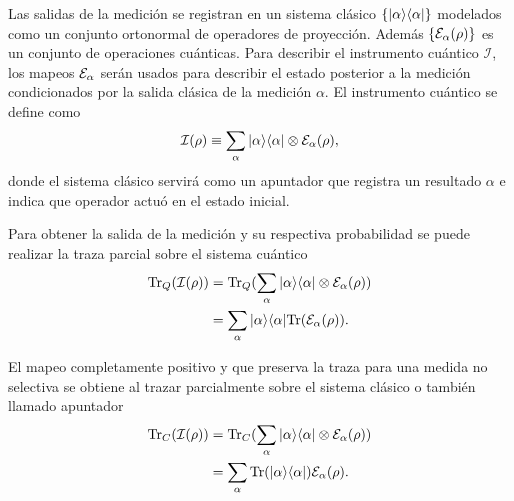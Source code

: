 Las salidas de la medición se registran en un sistema clásico $\{|\alpha\rangle \langle
\alpha |\}$ modelados como un conjunto ortonormal de operadores de proyección.
Además $\{\mathcal{E}_\alpha(\rho)\}$ es un conjunto de operaciones cuánticas. Para
describir el instrumento cuántico $\mathcal{I}$, los mapeos $\mathcal{E}_\alpha$ serán
usados para describir  el estado posterior a la medición condicionados por la
salida clásica de la medición $\alpha$. El instrumento cuántico se define
como
\begin{equation}
    \mathcal{I}(\rho)\equiv\sum_\alpha |\alpha\rangle \langle\alpha|\otimes \mathcal{E}_\alpha(\rho),
\end{equation}
donde el sistema clásico servirá como un apuntador que registra un resultado $\alpha$ e indica que operador actuó en el estado inicial.



Para obtener la salida de la medición y su respectiva probabilidad se puede
realizar la traza parcial sobre el sistema cuántico \begin{equation}
    \begin{split}
        {\rm Tr}_Q(\mathcal{I}(\rho))&={\rm Tr}_Q(\sum_\alpha |\alpha\rangle \langle\alpha|\otimes \mathcal{E}_\alpha(\rho))\\
        &=\sum_\alpha |\alpha\rangle \langle\alpha|{\rm Tr}(\mathcal{E}_\alpha(\rho)).
    \end{split}
\end{equation}

El mapeo completamente positivo y que preserva la traza para una medida no selectiva se obtiene al trazar parcialmente sobre el sistema clásico o también llamado apuntador\begin{equation}
    \begin{split}
        {\rm Tr}_C(\mathcal{I}(\rho))&={\rm Tr}_C(\sum_\alpha |\alpha\rangle \langle\alpha|\otimes \mathcal{E}_\alpha(\rho))\\
        &=\sum_\alpha {\rm Tr}(|\alpha\rangle \langle\alpha|)\mathcal{E}_\alpha(\rho).
    \end{split}
\end{equation}

